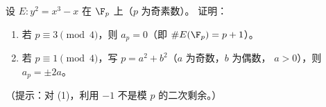 \begin{exercise}
\label{ex:ch2-5}
设 $E\colon y^2 = x^3 - x$ 在 $\F_p$ 上（$p$ 为奇素数）。
证明：
\begin{enumerate}
  \item 若 $p \equiv 3 \pmod{4}$，则 $a_p = 0$（即 $\#E(\F_p) = p + 1$）。
  \item 若 $p \equiv 1 \pmod{4}$，写 $p = a^2 + b^2$（$a$ 为奇数，$b$ 为偶数，
    $a > 0$），则 $a_p = \pm 2a$。
\end{enumerate}
（提示：对 (1)，利用 $-1$ 不是模 $p$ 的二次剩余。）
\end{exercise}
